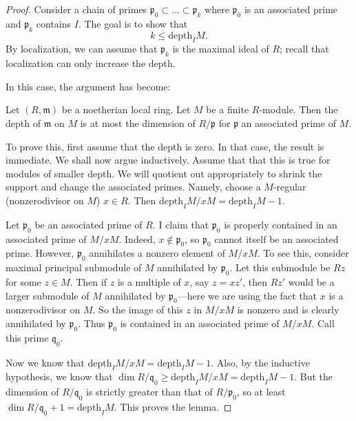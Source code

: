 \begin{proof} Consider a chain of primes $\mathfrak{p}_0 \subset \dots \subset
\mathfrak{p}_k$ where $\mathfrak{p}_0$ is an associated prime and
$\mathfrak{p}_k$ contains $I$. 
The goal is to show that 
\[ k \leq \mathrm{depth}_I M.  \]
By localization, we can assume that $\mathfrak{p}_k$ is the maximal ideal of
$R$; recall that localization can only increase the depth.

In this case, the argument has become:
\begin{lemma} 
Let $(R,\mathfrak{m})$ be a noetherian local ring. Let $M$ be a finite
$R$-module. Then the depth of $\mathfrak{m}$ on $M$ is at most the dimension of
$R/\mathfrak{p}$ for $\mathfrak{p}$ an associated prime of $M$.
\end{lemma} 

To prove this, first assume that the depth is zero. In that case, the result is
immediate. We shall now argue inductively.
Assume that that this is true for modules of smaller depth. 
We will quotient out appropriately to shrink the
support and change the associated 
primes. Namely, choose a $M$-regular (nonzerodivisor on $M$) $x \in R$. 
Then $\mathrm{depth}_I M/xM = \mathrm{depth}_I M -1$. 

Let $\mathfrak{p}_0$ be an associated prime of $R$.
I claim that $\mathfrak{p}_0$ is properly contained in an associated prime of
$M/xM$. Indeed, $x \notin \mathfrak{p}_0$, so $\mathfrak{p}_0$ cannot itself be
an associated prime. 
However, $\mathfrak{p}_0$ annihilates a nonzero element of $M/xM$. To see this,
consider maximal principal submodule of $M$ annihilated by $\mathfrak{p}_0$.
Let this submodule be $Rz$ for some $z \in M$. Then if $z$ is a multiple of
$x$, say $z = xz'$, then $Rz'$ would be a larger
submodule of $M$ annihilated by $\mathfrak{p}_0$---here we are using the fact
that $x$ is a nonzerodivisor on $M$. So the image of this $z$ in $M/xM$ is
nonzero and is clearly annihilated by $\mathfrak{p}_0$. 
Thus $\mathfrak{p}_0$ is contained in an associated prime of $M/xM$. Call this
prime $\mathfrak{q}_0$. 

Now we know that $\mathrm{depth}_I M/xM = \mathrm{depth}_I M -1$. Also, by the inductive
hypothesis, we know that $\dim R/\mathfrak{q}_0 \geq \mathrm{depth}_I M/xM = \mathrm{depth}_I M
-1$. But the dimension of $R/\mathfrak{q}_0$ is strictly greater than that of
$R/\mathfrak{p}_0$, so at least $\dim R/\mathfrak{q}_0 +1 = \mathrm{depth}_I M$. This
proves the lemma.
\end{proof} 




